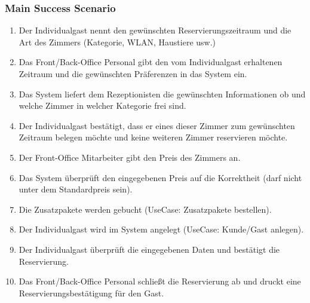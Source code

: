 \documentclass[./detailed_overview_usecases.tex]{subfiles}
\begin{document}
    \subsubsection*{Main Success Scenario}
    \begin{enumerate}
        \item Der Individualgast nennt den gewünschten Reservierungszeitraum und die Art des Zimmers (Kategorie, WLAN, Haustiere usw.)
        \item Das Front/Back-Office Personal gibt den vom Individualgast erhaltenen Zeitraum und die gewünschten Präferenzen in das System ein.
        \item Das System liefert dem Rezeptionisten die gewünschten Informationen ob und welche Zimmer in welcher Kategorie frei sind.
        \item Der Individualgast bestätigt, dass er eines dieser Zimmer zum gewünschten Zeitraum belegen möchte und keine weiteren Zimmer reservieren möchte.
        \item Der Front-Office Mitarbeiter gibt den Preis des Zimmers an.
        \item Das System überprüft den eingegebenen Preis auf die Korrektheit (darf nicht unter dem Standardpreis sein).
        \item Die Zusatzpakete werden gebucht (UseCase: Zusatzpakete bestellen).
        \item Der Individualgast wird im System angelegt (UseCase: Kunde/Gast anlegen).
        \item Der Individualgast überprüft die eingegebenen Daten und bestätigt die Reservierung.
        \item Das Front/Back-Office Personal schließt die Reservierung ab und druckt eine Reservierungsbestätigung für den Gast.
    \end{enumerate}
\end{document}
